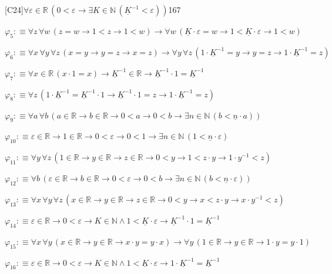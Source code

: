 \begin{fullproof}{[C24]}{$\forall \varepsilon \in \mathbb{R}\,(0 < \varepsilon \to \exists K \in \mathbb{N}\,(\underline{K}^{-1} < \varepsilon))$}{167}
\begin{abbrevlist}
\item $\varphi_{5} :\equiv \forall z\,\forall w\,(z = w \to 1 < z \to 1 < w) \to \forall w\,(\underline{K} \cdot \varepsilon = w \to 1 < \underline{K} \cdot \varepsilon \to 1 < w)$
\item $\varphi_{6} :\equiv \forall x\,\forall y\,\forall z\,(x = y \to y = z \to x = z) \to \forall y\,\forall z\,(1 \cdot \underline{K}^{-1} = y \to y = z \to 1 \cdot \underline{K}^{-1} = z)$
\item $\varphi_{7} :\equiv \forall x \in \mathbb{R}\,(x \cdot 1 = x) \to \underline{K}^{-1} \in \mathbb{R} \to \underline{K}^{-1} \cdot 1 = \underline{K}^{-1}$
\item $\varphi_{8} :\equiv \forall z\,(1 \cdot \underline{K}^{-1} = \underline{K}^{-1} \cdot 1 \to \underline{K}^{-1} \cdot 1 = z \to 1 \cdot \underline{K}^{-1} = z)$
\item $\varphi_{9} :\equiv \forall a\,\forall b\,(a \in \mathbb{R} \to b \in \mathbb{R} \to 0 < a \to 0 < b \to \exists n \in \mathbb{N}\,(b < \underline{n} \cdot a))$
\item $\varphi_{10} :\equiv \varepsilon \in \mathbb{R} \to 1 \in \mathbb{R} \to 0 < \varepsilon \to 0 < 1 \to \exists n \in \mathbb{N}\,(1 < \underline{n} \cdot \varepsilon)$
\item $\varphi_{11} :\equiv \forall y\,\forall z\,(1 \in \mathbb{R} \to y \in \mathbb{R} \to z \in \mathbb{R} \to 0 < y \to 1 < z \cdot y \to 1 \cdot y^{-1} < z)$
\item $\varphi_{12} :\equiv \forall b\,(\varepsilon \in \mathbb{R} \to b \in \mathbb{R} \to 0 < \varepsilon \to 0 < b \to \exists n \in \mathbb{N}\,(b < \underline{n} \cdot \varepsilon))$
\item $\varphi_{13} :\equiv \forall x\,\forall y\,\forall z\,(x \in \mathbb{R} \to y \in \mathbb{R} \to z \in \mathbb{R} \to 0 < y \to x < z \cdot y \to x \cdot y^{-1} < z)$
\item $\varphi_{14} :\equiv \varepsilon \in \mathbb{R} \to 0 < \varepsilon \to K \in \mathbb{N} \land 1 < \underline{K} \cdot \varepsilon \to \underline{K}^{-1} \cdot 1 = \underline{K}^{-1}$
\item $\varphi_{15} :\equiv \forall x\,\forall y\,(x \in \mathbb{R} \to y \in \mathbb{R} \to x \cdot y = y \cdot x) \to \forall y\,(1 \in \mathbb{R} \to y \in \mathbb{R} \to 1 \cdot y = y \cdot 1)$
\item $\varphi_{16} :\equiv \varepsilon \in \mathbb{R} \to 0 < \varepsilon \to K \in \mathbb{N} \land 1 < \underline{K} \cdot \varepsilon \to 1 \cdot \underline{K}^{-1} = \underline{K}^{-1}$

\end{abbrevlist}
\end{fullproof}
